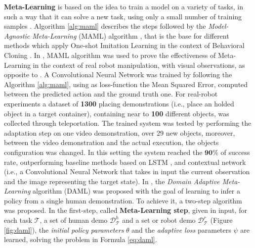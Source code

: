 \textbf{Meta-Learning} is based on the idea to train a model on a variety of tasks, in such a way that it can solve a new task, using only a small number of training samples \cite{finn2017maml}. Algorithm \ref{alg:maml} describes the steps followed by the \textit{Model-Agnostic Meta-Learning} (MAML) algorithm \cite{finn2017maml}, that is the base for different methods which apply One-shot Imitation Learning in the context of Behavioral Cloning \cite{finn2017one_shot_visual_il,yu2018daml,yu2018one_shot_hil}.
\newline In \cite{finn2017one_shot_visual_il}, MAML algorithm was used to prove the effectiveness of Meta-Learning in the context of real robot manipulation, with visual observations, as opposite to \cite{duan2017one_shot_il}. A Convolutional Neural Network was trained by following the Algorithm \ref{alg:maml}, using as loss-function the Mean Squared Error, computed between the predicted action and the ground truth one. For real-robot experiments a dataset of \textbf{1300} placing demonstrations (i.e., place an holded object in a target container), containing near to \textbf{100} different objects, was collected through teleportation. The trained system was tested by performing the adaptation step on one video demonstration, over 29 new objects, moreover, between the video demonstration and the actual execution, the objects configuration was changed. In this setting the system reached the $\mathbf{90\%}$ of success rate, outperforming baseline methods based on LSTM \cite{duan2017one_shot_il}, and contextual network (i.e., a Convolutional Neural Network that takes in input the current observation and the image representing the target state).
In \cite{yu2018daml}, the \textit{Domain Adaptive Meta-Learning} algorithm (DAML) was proposed with the goal of learning to infer a policy from a single human demonstration. To achieve it, a two-step algorithm was proposed. In the first-step, called \textbf{Meta-Learning step}, given in input, for each task $\mathcal{T}$, a set of human demo $\mathcal{D}^{h}_{\mathcal{T}}$ and a set or robot demo $\mathcal{D}^{r}_{\mathcal{T}}$ (Figure \ref{fig:daml}), the \textit{initial policy parameters} $\theta$ and the \textit{adaptive loss} parameters $\psi$ are learned, solving the problem in Formula \ref{eq:daml}. 
